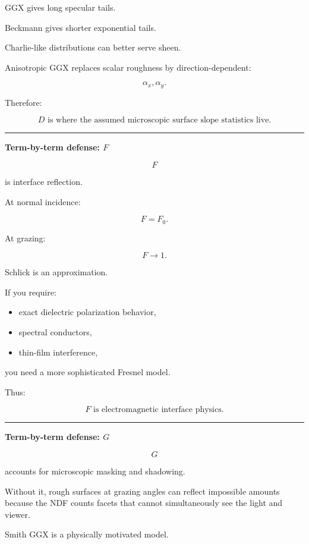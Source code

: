 GGX gives long specular tails.

Beckmann gives shorter exponential tails.

Charlie-like distributions can better serve sheen.

Anisotropic GGX replaces scalar roughness by direction-dependent:

\[
\alpha_x,\alpha_y.
\]

Therefore:

\[
\boxed{
D\text{ is where the assumed microscopic surface slope statistics live.}
}
\]

\begin{center}\rule{0.5\linewidth}{0.5pt}\end{center}

\textbf{Term-by-term defense: \(F\)}

\[
F
\]

is interface reflection.

At normal incidence:

\[
F=F_0.
\]

At grazing:

\[
F\rightarrow1.
\]

Schlick is an approximation.

If you require:

\begin{itemize}
\tightlist
\item
  exact dielectric polarization behavior,
\item
  spectral conductors,
\item
  thin-film interference,
\end{itemize}

you need a more sophisticated Fresnel model.

Thus:

\[
\boxed{
F\text{ is electromagnetic interface physics.}
}
\]

\begin{center}\rule{0.5\linewidth}{0.5pt}\end{center}

\textbf{Term-by-term defense: \(G\)}

\[
G
\]

accounts for microscopic masking and shadowing.

Without it, rough surfaces at grazing angles can reflect impossible amounts because the NDF counts facets that cannot simultaneously see the light and viewer.

Smith GGX is a physically motivated model.

